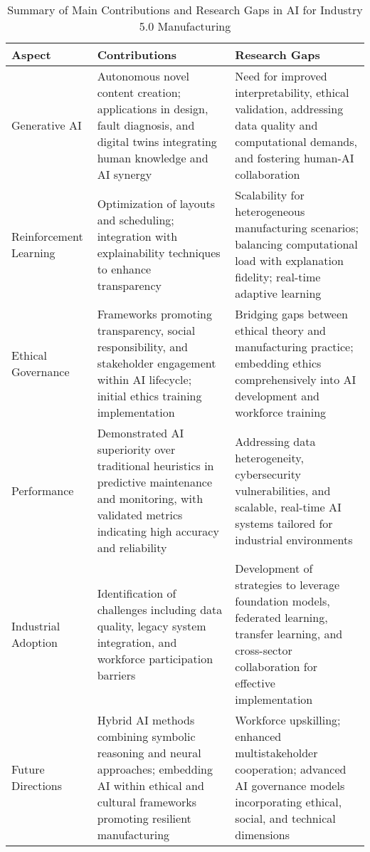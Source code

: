 \documentclass[sigconf]{acmart}
\begin{document}
\begin{table*}[htbp]
\centering
\caption{Summary of Main Contributions and Research Gaps in AI for Industry 5.0 Manufacturing}
\label{tab:contributions_gaps}
\begin{adjustbox}{max width=\textwidth}
\begin{tabular}{@{}lll@{}}
\toprule
\textbf{Aspect} & \textbf{Contributions} & \textbf{Research Gaps} \\
\midrule
Generative AI & Autonomous novel content creation; applications in design, fault diagnosis, and digital twins integrating human knowledge and AI synergy~\cite{ref1,ref2,ref6} & Need for improved interpretability, ethical validation, addressing data quality and computational demands, and fostering human-AI collaboration~\cite{ref3,ref14} \\
Reinforcement Learning & Optimization of layouts and scheduling; integration with explainability techniques to enhance transparency~\cite{ref5,ref30} & Scalability for heterogeneous manufacturing scenarios; balancing computational load with explanation fidelity; real-time adaptive learning~\cite{ref35,ref36} \\
Ethical Governance & Frameworks promoting transparency, social responsibility, and stakeholder engagement within AI lifecycle; initial ethics training implementation~\cite{ref25,ref38} & Bridging gaps between ethical theory and manufacturing practice; embedding ethics comprehensively into AI development and workforce training~\cite{ref19,ref21} \\
Performance & Demonstrated AI superiority over traditional heuristics in predictive maintenance and monitoring, with validated metrics indicating high accuracy and reliability~\cite{ref4,ref24,ref32} & Addressing data heterogeneity, cybersecurity vulnerabilities, and scalable, real-time AI systems tailored for industrial environments~\cite{ref29,ref35,ref39} \\
Industrial Adoption & Identification of challenges including data quality, legacy system integration, and workforce participation barriers~\cite{ref3,ref7} & Development of strategies to leverage foundation models, federated learning, transfer learning, and cross-sector collaboration for effective implementation~\cite{ref5,ref8} \\
Future Directions & Hybrid AI methods combining symbolic reasoning and neural approaches; embedding AI within ethical and cultural frameworks promoting resilient manufacturing~\cite{ref35,ref37,ref25} & Workforce upskilling; enhanced multistakeholder cooperation; advanced AI governance models incorporating ethical, social, and technical dimensions~\cite{ref2,ref3,ref21} \\
\bottomrule
\end{tabular}
\end{adjustbox}
\end{table*}
\end{document}
